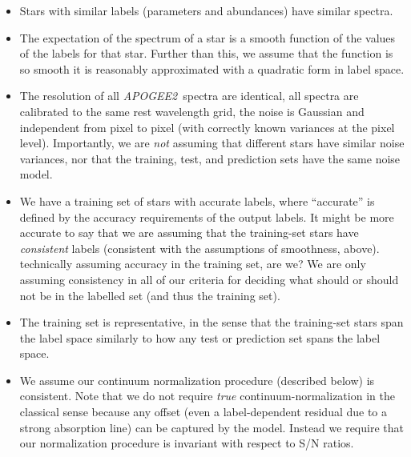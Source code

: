 \documentclass[12pt,preprint]{aastex}
\newcommand{\project}[1]{\textsl{#1}}
\newcommand{\TheCannon}{\project{The~Cannon}}
\newcommand{\acronym}[1]{{\small{#1}}}
\newcommand{\apogee}{\project{\acronym{APOGEE2}}}
\begin{document}
\begin{itemize}
\item
Stars with similar labels (parameters and abundances) have similar spectra.
\item
The expectation of the spectrum of a star is a smooth function of the values of 
the labels for that star.  Further than this, we assume that the function is so 
smooth it is reasonably approximated with a quadratic form in label space.
\item
The resolution of all \apogee\ spectra are identical, all spectra are calibrated
to the same rest wavelength grid, the noise is Gaussian and independent from 
pixel to pixel (with correctly known variances at the pixel level).  
Importantly, we are \emph{not} assuming that different stars have similar noise
variances, nor that the training, test, and prediction sets have the same noise 
model.
\item
We have a training set of stars with accurate labels, where ``accurate'' is 
defined by the accuracy requirements of the output labels.  It might be more 
accurate to say that we are assuming that the training-set stars have 
\emph{consistent} labels (consistent with the assumptions of smoothness, above).
technically assuming accuracy in the training set, are we? We are only assuming 
consistency in all of our criteria for deciding what should or should not be in 
the labelled set (and thus the training set).
\item
The training set is representative, in the sense that the training-set stars 
span the label space similarly to how any test or prediction set spans the label
space.
\item
We assume our continuum normalization procedure (described below) is consistent.
Note that we do not require \emph{true} continuum-normalization in the classical
sense because any offset (even a label-dependent residual due to a strong 
absorption line) can be captured by the model.  Instead we require that our 
normalization procedure is invariant with respect to S/N ratios.
\end{itemize}
\end{document}
